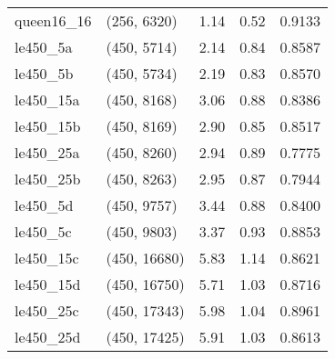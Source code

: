 \begin{tabular}{llrrr}
queen16\_16 &  (256, 6320) &      1.14 &     0.52 & 0.9133 \\
  le450\_5a &  (450, 5714) &      2.14 &     0.84 & 0.8587 \\
  le450\_5b &  (450, 5734) &      2.19 &     0.83 & 0.8570 \\
 le450\_15a &  (450, 8168) &      3.06 &     0.88 & 0.8386 \\
 le450\_15b &  (450, 8169) &      2.90 &     0.85 & 0.8517 \\
 le450\_25a &  (450, 8260) &      2.94 &     0.89 & 0.7775 \\
 le450\_25b &  (450, 8263) &      2.95 &     0.87 & 0.7944 \\
  le450\_5d &  (450, 9757) &      3.44 &     0.88 & 0.8400 \\
  le450\_5c &  (450, 9803) &      3.37 &     0.93 & 0.8853 \\
 le450\_15c & (450, 16680) &      5.83 &     1.14 & 0.8621 \\
 le450\_15d & (450, 16750) &      5.71 &     1.03 & 0.8716 \\
 le450\_25c & (450, 17343) &      5.98 &     1.04 & 0.8961 \\
 le450\_25d & (450, 17425) &      5.91 &     1.03 & 0.8613 \\
\bottomrule
\end{tabular}
